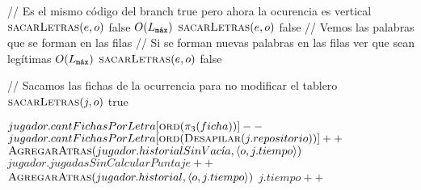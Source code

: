 \begin{algorithm}[H]
\begin{algorithmic}[1]
    \Else

      \State // Es el mismo código del branch true pero ahora la ocurencia es vertical
      \State{}
      \State{}
          \State{}
            \State$\textsc{sacarLetras}(e,o)$
            \State\Return false
          \EndIf
      \EndFor
      \Comment$O(\Lmax)$
        \State$\textsc{sacarLetras}(e,o)$
        \State\Return false
      \EndIf
      \State // Vemos las palabras que se forman en las filas
        \State{}
        \State{}
        \State // Si se forman nuevas palabras en las filas ver que sean legítimas
        \Comment$O(\Lmax)$
          \State$\textsc{sacarLetras}(e,o)$
          \State\Return false
        \EndIf
      \EndFor


    \EndIf

    \State // Sacamos las fichas de la ocurrencia para no modificar el tablero
    \State$\textsc{sacarLetras}(j,o)$
    \State\Return true
  \end{algorithmic}
\end{algorithm}

\begin{algorithm}[H]
  \begin{algorithmic}[1]
    \State{}
      \State{}
      \State{}
      \State$jugador.cantFichasPorLetra[\textsc{ord}(\pi_{3}(ficha))]--$
      \State$jugador.cantFichasPorLetra[\textsc{ord}(\textsc{Desapilar}(j.repositorio))]++$
    \EndFor
      \State$\textsc{AgregarAtras}(jugador.historialSinVac\acute{\imath}a,\langle o, j.tiempo\rangle)$
      \State$jugador.jugadasSinCalcularPuntaje++$
    \EndIf
    \State$\textsc{AgregarAtras}(jugador.historial,\langle o, j.tiempo\rangle)$
    \State$j.tiempo++$
  \end{algorithmic}
\end{algorithm}

